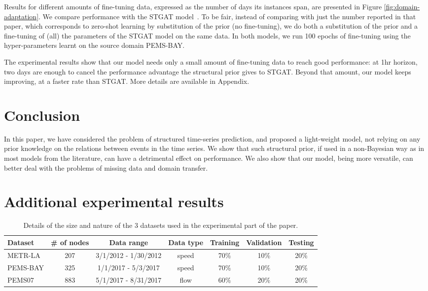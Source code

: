 \documentclass[a4paper]{article}
\begin{document}
Results for different amounts of fine-tuning data, expressed as the number of days its instances span, are presented in Figure \ref{fig:domain-adaptation}. We compare performance with the STGAT model~\cite{kong_stgat_2020}. To be fair, instead of comparing with just the number reported in that paper, which corresponds to zero-shot learning by substitution of the prior (no fine-tuning), we do both a substitution of the prior and a fine-tuning of (all) the parameters of the STGAT model on the same data. In both models, we run 100 epochs of fine-tuning using the hyper-parameters learnt on the source domain PEMS-BAY.

The experimental results show that our model needs only a small amount of fine-tuning data to reach good performance: at 1hr horizon, two days are enough to cancel the performance advantage the structural prior gives to STGAT. Beyond that amount, our model keeps improving, at a faster rate than STGAT. More details are available in Appendix.
\section{Conclusion}
In this paper, we have considered the problem of structured time-series prediction, and proposed a light-weight model, not relying on any prior knowledge on the relations between events in the time series. We show that such structural prior, if used in a non-Bayesian way as in most models from the literature, can have a detrimental effect on performance. We also show that our model, being more versatile, can better deal with the problems of missing data and domain transfer.

\clearpage

\printbibliography

\clearpage

\appendix
\section{Additional experimental results}



\begin{table}[p]
    \centering
    \begin{tabular}{l |c | c | c | c | c | c }
    Dataset & \# of nodes & Data range & Data type & Training & Validation & Testing \\
    \hline
    METR-LA & 207 & 3/1/2012 - 1/30/2012 & speed & 70\% & 10\% & 20\% \\
    \hline
    PEMS-BAY & 325 & 1/1/2017 - 5/3/2017 & speed & 70\% & 10\% & 20\%  \\
    \hline
    PEMS07 & 883 & 5/1/2017 - 8/31/2017 & flow & 60\% & 20\% & 20\% \\
    \hline
    \end{tabular}
    \caption{\label{tab:datasets}Details of the size and nature of the 3 datasets used in the experimental part of the paper.}
\end{table}
\end{document}

